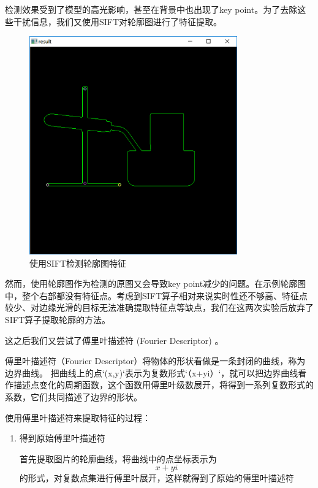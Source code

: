 \documentclass{article}
\begin{document}
\begin{enumerate}
\begin{enumerate}
    \qquad 检测效果受到了模型的高光影响，甚至在背景中也出现了key point。为了去除这些干扰信息，我们又使用SIFT对轮廓图进行了特征提取。
    
    \begin{figure}[h]
    \centering
    \includegraphics[width=0.8\textwidth]{images/SIFT-countour.png}
    \caption{使用SIFT检测轮廓图特征}\label{fig:digit}
    \end{figure} 
    
    \qquad 然而，使用轮廓图作为检测的原图又会导致key point减少的问题。在示例轮廓图中，整个右部都没有特征点。考虑到SIFT算子相对来说实时性还不够高、特征点较少、对边缘光滑的目标无法准确提取特征点等缺点，我们在这两次实验后放弃了SIFT算子提取轮廓的方法。
    
    \qquad 这之后我们又尝试了傅里叶描述符 (Fourier Descriptor) 。
    
    \qquad 傅里叶描述符（Fourier Descriptor）将物体的形状看做是一条封闭的曲线，称为边界曲线。
    把曲线上的点`(x,y)`表示为复数形式`（x+yi）`，就可以把边界曲线看作描述点变化的周期函数，这个函数用傅里叶级数展开，将得到一系列复数形式的系数，它们共同描述了边界的形状。
    
    使用傅里叶描述符来提取特征的过程：
    \begin{enumerate}
        \item 得到原始傅里叶描述符
        
        \qquad 首先提取图片的轮廓曲线，将曲线中的点坐标表示为 $$ x + y i $$的形式，对复数点集进行傅里叶展开，这样就得到了原始的傅里叶描述符
        

\end{enumerate}
\end{enumerate}
\end{enumerate}
\end{document}
